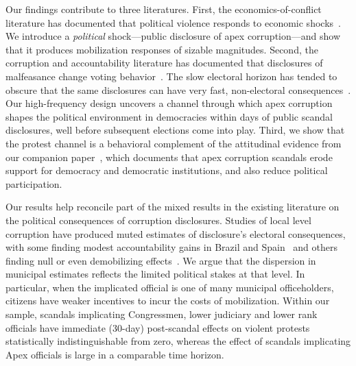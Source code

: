 \documentclass[11pt]{article}
\begin{document}
Our findings contribute to three literatures. First, the economics-of-conflict literature has documented that political violence responds to economic shocks~\citep{besley2011logic,berman2011hearts,dube2013commodity,koenig2017networks,mcguirk2020economic,rohner2026aidingpeace}. We introduce a \textit{political} shock---public disclosure of apex corruption---and show that it produces mobilization responses of sizable magnitudes. Second, the corruption and accountability literature has documented that disclosures of malfeasance change voting behavior~\citep{ferraz2008exposing,ferraz2011electoral,FerrazFinanAccount,ferraz2018audits,horacio2019infonetwork}. The slow electoral horizon has tended to obscure that the same disclosures can have very fast, non-electoral consequences~\citep{madestam2013protests,bursztyn2021persistent}. Our high-frequency design uncovers a channel through which apex corruption shapes the political environment in democracies within days of public scandal disclosures, well before subsequent elections come into play. Third, we show that the protest channel is a behavioral complement of the attitudinal evidence from our companion paper~\citep{ApexCorruption}, which documents that apex corruption scandals erode support for democracy and democratic institutions, and also reduce political participation.

Our results help reconcile part of the mixed results in the existing literature on the political consequences of corruption disclosures. Studies of local level corruption have produced muted estimates of disclosure's electoral consequences, with some finding modest accountability gains in Brazil and Spain~\citep{ferraz2008exposing,ferraz2011electoral,costasperez2012corruption,ferraz2018audits} and others finding null or even demobilizing effects~\citep{anduiza2013turning,chong2015does,pavao2018corruption,horacio2022metaketa}. We argue that the dispersion in municipal estimates reflects the limited political stakes at that level. In particular, when the implicated official is one of many municipal officeholders, citizens have weaker incentives to incur the costs of mobilization. Within our sample, scandals implicating Congressmen, lower judiciary and lower rank officials have immediate (30-day) post-scandal effects on violent protests statistically indistinguishable from zero, whereas the effect of scandals implicating Apex officials is large in a comparable time horizon.
\end{document}
